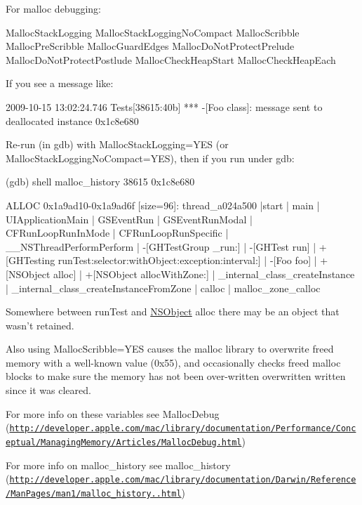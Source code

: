 \-For malloc debugging\-:

\begin{DoxyVerb}
 MallocStackLogging
 MallocStackLoggingNoCompact
 MallocScribble
 MallocPreScribble
 MallocGuardEdges
 MallocDoNotProtectPrelude
 MallocDoNotProtectPostlude
 MallocCheckHeapStart
 MallocCheckHeapEach
 \end{DoxyVerb}


\-If you see a message like\-:

\begin{DoxyVerb}
 2009-10-15 13:02:24.746 Tests[38615:40b] *** -[Foo class]: message sent to deallocated instance 0x1c8e680
 \end{DoxyVerb}


\-Re-\/run (in gdb) with {\ttfamily \-Malloc\-Stack\-Logging=\-Y\-E\-S} (or {\ttfamily \-Malloc\-Stack\-Logging\-No\-Compact=\-Y\-E\-S}), then if you run under gdb\-:

\begin{DoxyVerb}
 (gdb) shell malloc_history 38615 0x1c8e680
 
 ALLOC 0x1a9ad10-0x1a9ad6f [size=96]: thread_a024a500 |start | main | UIApplicationMain | GSEventRun | GSEventRunModal | CFRunLoopRunInMode | CFRunLoopRunSpecific | __NSThreadPerformPerform | -[GHTestGroup _run:] | -[GHTest run] | +[GHTesting runTest:selector:withObject:exception:interval:] | -[Foo foo] | +[NSObject alloc] | +[NSObject allocWithZone:] | _internal_class_createInstance | _internal_class_createInstanceFromZone | calloc | malloc_zone_calloc 
 
 \end{DoxyVerb}


\-Somewhere between run\-Test and \hyperlink{class_n_s_object}{\-N\-S\-Object} alloc there may be an object that wasn't retained.

\-Also using {\ttfamily \-Malloc\-Scribble=\-Y\-E\-S} causes the malloc library to overwrite freed memory with a well-\/known value (0x55), and occasionally checks freed malloc blocks to make sure the memory has not been over-\/written overwritten written since it was cleared.

\-For more info on these variables see \-Malloc\-Debug (\href{http://developer.apple.com/mac/library/documentation/Performance/Conceptual/ManagingMemory/Articles/MallocDebug.html}{\tt http\-://developer.\-apple.\-com/mac/library/documentation/\-Performance/\-Conceptual/\-Managing\-Memory/\-Articles/\-Malloc\-Debug.\-html})

\-For more info on malloc\-\_\-history see malloc\-\_\-history (\href{http://developer.apple.com/mac/library/documentation/Darwin/Reference/ManPages/man1/malloc_history.1.html}{\tt http\-://developer.\-apple.\-com/mac/library/documentation/\-Darwin/\-Reference/\-Man\-Pages/man1/malloc\-\_\-history..\-html}) 